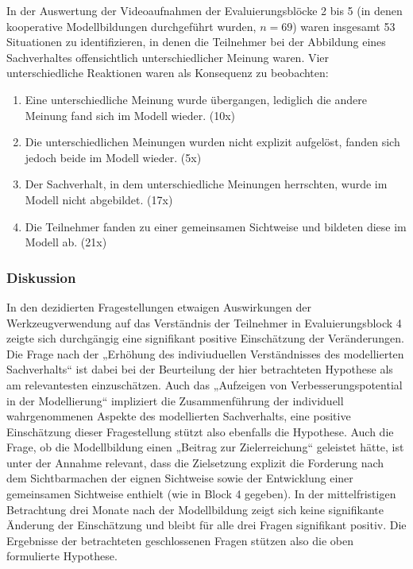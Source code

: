 In der Auswertung der Videoaufnahmen der Evaluierungsblöcke 2 bis 5 (in denen kooperative Modellbildungen durchgeführt wurden, $n=69$) waren insgesamt 53 Situationen zu identifizieren, in denen die Teilnehmer bei der Abbildung eines Sachverhaltes offensichtlich unterschiedlicher Meinung waren. Vier unterschiedliche Reaktionen waren als Konsequenz zu beobachten:
\begin{enumerate}
	\item Eine unterschiedliche Meinung wurde übergangen, lediglich die andere Meinung fand sich im Modell wieder. (10x)
	\item Die unterschiedlichen Meinungen wurden nicht explizit aufgelöst, fanden sich jedoch beide im Modell wieder. (5x)
	\item Der Sachverhalt, in dem unterschiedliche Meinungen herrschten, wurde im Modell nicht abgebildet. (17x)
	\item Die Teilnehmer fanden zu einer gemeinsamen Sichtweise und bildeten diese im Modell ab. (21x)
\end{enumerate}
  
\subsubsection{Diskussion} 

In den dezidierten Fragestellungen etwaigen Auswirkungen der Werkzeugverwendung auf das Verständnis der Teilnehmer in Evaluierungsblock 4 zeigte sich durchgängig eine signifikant positive Einschätzung der Veränderungen. Die Frage nach der „Erhöhung des indiviuduellen Verständnisses des modellierten Sachverhalts“ ist dabei bei der Beurteilung der hier betrachteten Hypothese als am relevantesten einzuschätzen. Auch das „Aufzeigen von Verbesserungspotential in der Modellierung“ impliziert die Zusammenführung der individuell wahrgenommenen Aspekte des modellierten Sachverhalts, eine positive Einschätzung dieser Fragestellung stützt also ebenfalls die Hypothese. Auch die Frage, ob die Modellbildung einen „Beitrag zur Zielerreichung“ geleistet hätte, ist unter der Annahme relevant, dass die Zielsetzung explizit die Forderung nach dem Sichtbarmachen der eignen Sichtweise sowie der Entwicklung einer gemeinsamen Sichtweise enthielt (wie in Block 4 gegeben). In der mittelfristigen Betrachtung drei Monate nach der Modellbildung zeigt sich keine signifikante Änderung der Einschätzung und bleibt für alle drei Fragen signifikant positiv. Die Ergebnisse der betrachteten geschlossenen Fragen stützen also die oben formulierte Hypothese.

